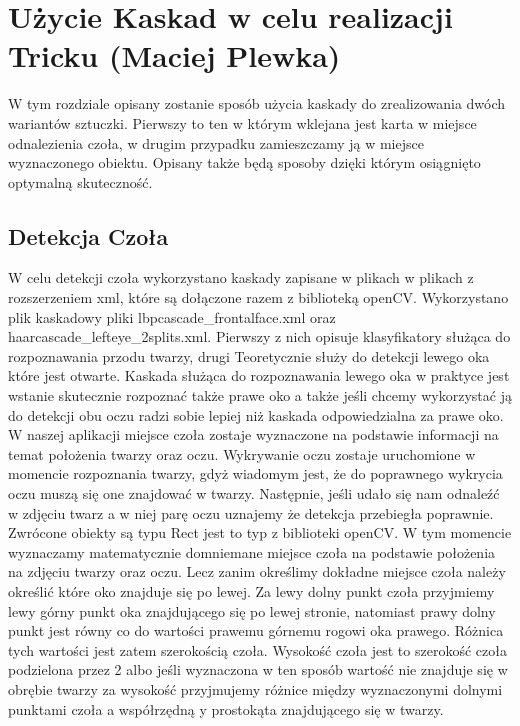 \section{Użycie Kaskad w celu realizacji Tricku (Maciej Plewka)}

W tym rozdziale opisany zostanie sposób użycia kaskady do zrealizowania dwóch wariantów sztuczki. Pierwszy to ten w którym wklejana jest karta w miejsce odnalezienia czoła, w drugim przypadku zamieszczamy ją w miejsce wyznaczonego obiektu. Opisany także będą sposoby dzięki którym osiągnięto optymalną skuteczność.

\subsection{Detekcja Czoła}

W celu detekcji czoła wykorzystano kaskady zapisane w plikach w plikach z rozszerzeniem xml, które są dołączone razem z biblioteką openCV. Wykorzystano plik kaskadowy pliki lbpcascade\_frontalface.xml oraz haarcascade\_lefteye\_2splits.xml.
Pierwszy z nich opisuje klasyfikatory służąca do rozpoznawania przodu twarzy, drugi 
Teoretycznie służy do detekcji lewego oka które jest otwarte. Kaskada służąca do rozpoznawania lewego oka w praktyce jest wstanie skutecznie rozpoznać także prawe oko a także jeśli chcemy wykorzystać ją do detekcji obu oczu radzi sobie lepiej niż kaskada odpowiedzialna za prawe oko. W naszej aplikacji miejsce czoła zostaje wyznaczone na podstawie informacji na temat położenia twarzy oraz oczu. Wykrywanie oczu zostaje uruchomione w momencie rozpoznania twarzy, gdyż wiadomym jest, że do poprawnego wykrycia oczu muszą się one znajdować w twarzy. 
Następnie, jeśli udało się nam odnaleźć w zdjęciu twarz a w niej parę oczu uznajemy że detekcja przebiegła poprawnie. Zwrócone obiekty są typu Rect jest to typ z biblioteki openCV. W tym momencie wyznaczamy matematycznie domniemane miejsce czoła na podstawie położenia na zdjęciu twarzy oraz oczu. Lecz zanim określimy dokładne miejsce czoła należy określić które oko znajduje się po lewej.
Za lewy dolny punkt czoła przyjmiemy lewy górny punkt oka znajdującego się po lewej stronie, natomiast prawy dolny punkt jest równy co do wartości prawemu górnemu rogowi oka prawego. Różnica tych wartości jest zatem szerokością czoła. Wysokość czoła jest to szerokość czoła podzielona przez 2 albo jeśli wyznaczona w ten sposób wartość nie znajduje się w obrębie twarzy za wysokość przyjmujemy różnice między wyznaczonymi dolnymi punktami czoła a współrzędną y prostokąta znajdującego się w twarzy.


